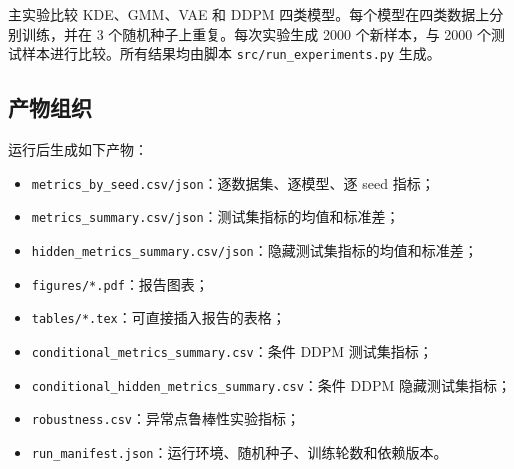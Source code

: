 \documentclass[a4paper,11pt]{article}
\begin{document}
主实验比较 KDE、GMM、VAE 和 DDPM 四类模型。每个模型在四类数据上分别训练，并在 3 个随机种子上重复。每次实验生成 2000 个新样本，与 2000 个测试样本进行比较。所有结果均由脚本 \texttt{src/run\_experiments.py} 生成。

\begin{table}[H]
\centering
\caption{模型设置}
\end{table}

\subsection{产物组织}

运行后生成如下产物：
\begin{itemize}
    \item \texttt{metrics\_by\_seed.csv/json}：逐数据集、逐模型、逐 seed 指标；
    \item \texttt{metrics\_summary.csv/json}：测试集指标的均值和标准差；
    \item \texttt{hidden\_metrics\_summary.csv/json}：隐藏测试集指标的均值和标准差；
    \item \texttt{figures/*.pdf}：报告图表；
    \item \texttt{tables/*.tex}：可直接插入报告的表格；
    \item \texttt{conditional\_metrics\_summary.csv}：条件 DDPM 测试集指标；
    \item \texttt{conditional\_hidden\_metrics\_summary.csv}：条件 DDPM 隐藏测试集指标；
    \item \texttt{robustness.csv}：异常点鲁棒性实验指标；
    \item \texttt{run\_manifest.json}：运行环境、随机种子、训练轮数和依赖版本。
\end{itemize}
\end{document}
